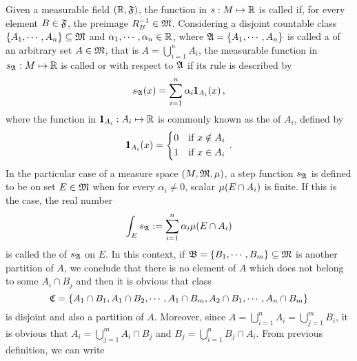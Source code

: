 Given a measurable field $(\mathbb{R},\mathfrak{F})$, the function in $s : M \mapsto \mathbb{R}$ is called  if, for every element ${B}\in\mathfrak{F}$, the preimage ${R}^{-1}_{{B}} \in \mathfrak{M}$. Considering a disjoint countable class $\{A_1,\cdots,A_n\}\subseteq\mathfrak{M}$ and $\alpha_1,\cdots,\alpha_n\in\mathbb{R}$, where $\mathfrak{A}=\{A_1,\cdots,A_n\}$ is called a  of an arbitrary set $A\in\mathfrak{M}$, that is $A=\bigcup_{i=1}^nA_i$, the measurable function in $s_{\mathfrak{A}} : M \mapsto \mathbb{R}$ is called  or  with respect to $\mathfrak{A}$ if its rule is described by
\begin{equation}
s_{\mathfrak{A}}(x) = \sum_{i=1}^n\alpha_i\pmb{1}_{A_i}(x)\,,
\end{equation}
where the function in $\pmb{1}_{A_i} : A_i \mapsto \mathbb{R}$ is commonly known as the  of $A_i$, defined by
\begin{equation*}
\pmb{1}_{A_i}(x)=
\begin{dcases}
0 & \text{if } x\notin A_i\\
1 & \text{if } x\in A_i
\end{dcases}\,.
\end{equation*}
In the particular case of a measure space $(M,\mathfrak{M},\mu)$, a step function $s_{\mathfrak{A}}$ is defined to be  on set $E\in\mathfrak{M}$ when for every $\alpha_i\neq 0$, scalar $\mu(E\cap A_i)$ is finite. If this is the case, the real number
\begin{equation}\label{eq:defInteSimp}
\int_E s_{\mathfrak{A}} := \sum_{i=1}^n\alpha_i\mu(E\cap A_i)
\end{equation}
is called the  of $s_{\mathfrak{A}}$ on $E$. In this context, if $\mathfrak{B}=\{B_1,\cdots,B_m\}\subseteq\mathfrak{M}$ is another partition of $A$, we conclude that there is no element of $A$ which does not belong to some $A_i\cap B_j$ and then it is obvious that class 
\begin{equation*}
\mathfrak{C}=\{A_1\cap B_1,A_1\cap B_2,\cdots,A_1\cap B_m,A_2\cap B_1,\cdots,A_n\cap B_m\}
\end{equation*}
is disjoint and also a partition of $A$. Moreover, since $A=\bigcup_{i=1}^n A_i=\bigcup_{j=1}^m B_i$, it is obvious that $A_i=\bigcup_{j=1}^mA_i\cap B_j$ and $B_j=\bigcup_{i=1}^n B_j \cap A_i$. From previous definition, we can write
